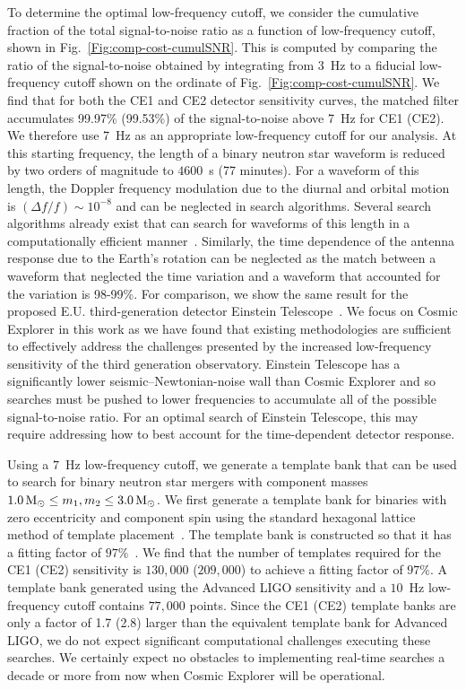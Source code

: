 To determine the optimal low-frequency cutoff, we consider the cumulative fraction of the total signal-to-noise ratio as a function of low-frequency cutoff, shown in Fig.~\ref{Fig:comp-cost-cumulSNR}. This is computed by comparing the ratio of the signal-to-noise obtained by integrating from $3$~Hz to a fiducial low-frequency cutoff shown on the ordinate of Fig.~\ref{Fig:comp-cost-cumulSNR}.
We find that for both the CE1 and CE2 detector sensitivity curves, the matched filter accumulates 99.97\% (99.53\%) of the signal-to-noise above 7~Hz for CE1 (CE2). We therefore use 7~Hz as an appropriate low-frequency cutoff for our analysis. At this starting frequency, the length of a binary neutron star waveform is reduced by two orders of magnitude to $4600$~s (77 minutes). For a
waveform of this length, the Doppler frequency modulation due to the diurnal
and orbital motion is $(\Delta f / f ) \sim 10^{-8}$ and can be neglected in
search algorithms. Several search algorithms already exist that can search for waveforms of this length in a computationally efficient manner~\cite{Adams:2015ulm,Sachdev:2019vvd,Cannon:2020qnf}. Similarly, the time dependence of the antenna response due to the Earth's rotation can be neglected as the match between a waveform that neglected the time variation and a waveform that accounted for the variation is 98-99\%. For comparison, we show the same result for the proposed E.U. third-generation detector Einstein Telescope~\cite{Maggiore:2019uih}. We focus on Cosmic Explorer in this work as we have found that existing methodologies are sufficient to effectively address the challenges presented by the increased low-frequency sensitivity of the third generation observatory.  Einstein Telescope has a significantly lower seismic--Newtonian-noise wall than Cosmic Explorer and so searches must be pushed to lower frequencies to accumulate all of the possible signal-to-noise ratio. For an optimal search of Einstein Telescope, this may require addressing how to best account for the time-dependent detector response. 

Using a $7$~Hz low-frequency cutoff, we generate a template bank that can be used to search for binary neutron star mergers with component masses $1.0\, \mathrm{M}_{\odot} \leq m_1,m_2 \leq 3.0\,\mathrm{M}_{\odot}$. We first generate a template bank for binaries with zero eccentricity and component spin using the standard hexagonal lattice method of template placement~\cite{Owen:1995tm,Owen:1998dk,Cokelaer:2007kx,Brown:2012qf}. The template bank is constructed so that it has a fitting factor of $97\%$~\cite{Apostolatos:1995pj}. We find that the number of templates required for the CE1 (CE2) sensitivity is $130,000$ ($209,000$) to achieve a fitting factor of $97\%$. A template bank generated using the Advanced LIGO sensitivity and a $10$~Hz low-frequency cutoff contains $77,000$ points. Since the CE1 (CE2) template banks are only a factor of 1.7 (2.8) larger than the equivalent template bank for Advanced LIGO, we do not expect significant computational challenges executing these searches. We certainly expect no obstacles to implementing real-time searches a decade or more from now when Cosmic Explorer will be operational.

